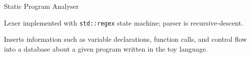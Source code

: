 \begin{cventries}

	{Static Program Analyser} %
	{} %
	{} %
	{
		\begin{cvitems} %
			\item Lexer implemented with \texttt{std::regex} state machine; parser is recursive-descent.
			\item Inserts information such as variable declarations, function calls, and control flow into a database about a given program written in the toy language.
		\end{cvitems}
	}

\end{cventries}
